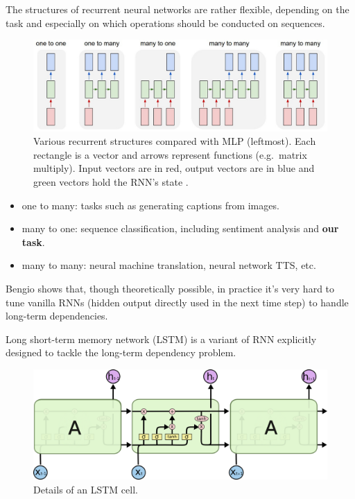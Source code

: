 \documentclass[11pt,a4paper]{report}
\begin{document}
The structures of recurrent neural networks are rather flexible, depending on the task and especially on which operations should be conducted on sequences.

\begin{figure}[htbp]
  \centering
  \includegraphics[width=\textwidth]{rnns.jpeg}
  \caption[Various recurrent structures compared with MLP.]{Various recurrent structures compared with MLP (leftmost).
    Each rectangle is a vector and arrows represent functions (e.g.\, matrix multiply).
    Input vectors are in red, output vectors are in blue and green vectors hold the RNN's state \protect\footnotemark.}
  \label{fig:rnns}
\end{figure}


\begin{itemize}
  \item one to many: tasks such as generating captions from images.
  \item many to one: sequence classification, including sentiment analysis and \textbf{our task}.
  \item many to many: neural machine translation, neural network TTS, etc.
\end{itemize}

Bengio \parencite{bengio1994learning} shows that, though theoretically possible, in practice it's very hard to tune vanilla RNNs (hidden output directly used in the next time step) to handle long-term dependencies.

Long short-term memory network (LSTM) is a variant of RNN explicitly designed to tackle the long-term dependency problem.

\begin{figure}[htbp]
  \centering
  \includegraphics[width=\textwidth]{LSTM3-chain.png}
  \caption[Details of an LSTM cell.]{Details of an LSTM cell\protect\footnotemark.} \label{fig:lstm-intro}
\end{figure}
\end{document}
